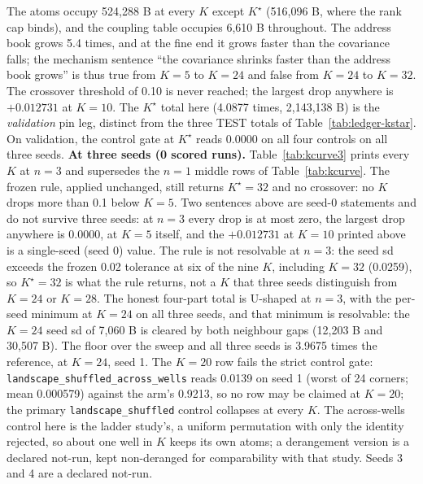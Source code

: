 \documentclass{article} %
\newcommand{\Kstar}{\ensuremath{K^{\star}}}
\begin{document}
\noindent The atoms occupy 524,288 B at every $K$ except $\Kstar$ (516,096 B, where the rank cap
binds), and the coupling table occupies 6,610 B throughout. The address book grows 5.4 times, and
at the fine end it grows faster than the covariance falls; the mechanism sentence ``the
covariance shrinks faster than the address book grows'' is thus true from $K=5$ to $K=24$ and
false from $K=24$ to $K=32$. The crossover threshold of 0.10 is never reached; the largest drop
anywhere is $+0.012731$ at $K=10$. The $\Kstar$ total here (4.0877 times, 2,143,138 B) is the
\emph{validation} pin leg, distinct from the three TEST totals of Table~\ref{tab:ledger-kstar}. %
On validation, the control gate at $\Kstar$ reads 0.0000 on all four controls on all three seeds.
\textbf{At three seeds (0 scored runs).} Table~\ref{tab:kcurve3} prints
every $K$ at $n=3$ and supersedes the $n=1$ middle rows of Table~\ref{tab:kcurve}.
The frozen rule, applied unchanged, still returns $\Kstar=32$ and no crossover: no $K$ drops more
than 0.1 below $K=5$. Two sentences above are seed-0 statements and do not survive three seeds: at
$n=3$ every drop is at most zero, the largest drop anywhere is 0.0000, at $K=5$ itself, and the
$+0.012731$ at $K=10$ printed above is a single-seed (seed 0) value. The rule is not resolvable at $n=3$: the seed sd
exceeds the frozen 0.02 tolerance at six of the nine $K$, including $K=32$ (0.0259), so $\Kstar=32$
is what the rule returns, not a $K$ that three seeds distinguish from $K=24$ or $K=28$. The honest
four-part total is U-shaped at $n=3$, with the per-seed minimum at $K=24$ on all three seeds, and
that minimum is resolvable: the $K=24$ seed sd of 7,060 B is cleared by both neighbour gaps (12,203
B and 30,507 B). The floor over the sweep and all three seeds is 3.9675 times the reference, at
$K=24$, seed 1. The $K=20$ row fails the strict control gate:
\texttt{landscape\_shuffled\_across\_wells} reads 0.0139 on seed 1 (worst of 24 corners; mean
0.000579) against the arm's 0.9213, so no row may be claimed at $K=20$; the primary
\texttt{landscape\_shuffled} control collapses at every $K$. The across-wells control here is
the ladder study's, a uniform permutation with only the identity rejected, so about one well in $K$ keeps its
own atoms; a derangement version is a declared not-run, kept non-deranged for comparability with
that study. Seeds 3 and 4 are a declared not-run.
\end{document}
